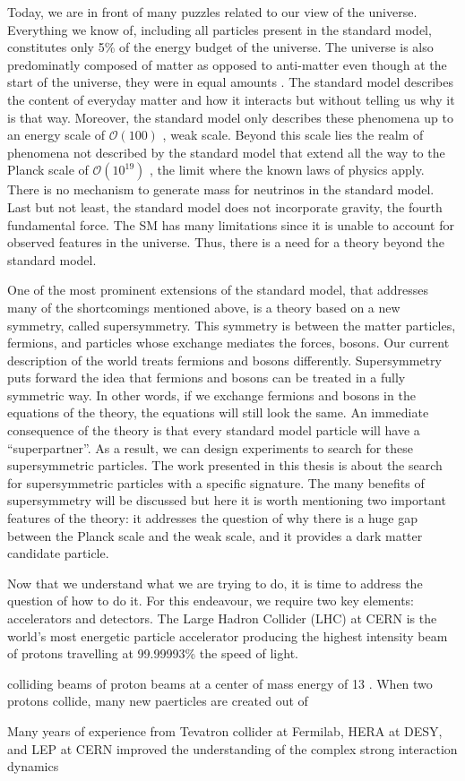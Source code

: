 Today, we are in front of many puzzles related to our view of the universe.
Everything we know of, including all particles present in the standard model, 
constitutes only 5\% of the energy budget of the universe. 
The universe is also predominatly composed of matter as opposed to 
anti-matter even though at the start of the universe, they were in equal 
amounts%
. The standard model describes the content of 
everyday matter 
and how it interacts but without telling us why it is that way.
Moreover, the standard model only describes these phenomena 
up to an energy scale of $\mathcal{O}\left(100\right)$ \GeV, weak scale.
Beyond this scale lies the realm of phenomena not described by the standard 
model that extend all the way to the Planck scale of 
$\mathcal{O}\left(10^{19}\right)$ \GeV, the limit where the known laws of 
physics apply. 
There is no mechanism to generate mass for 
neutrinos in the standard model. Last but not least, the standard model 
does not incorporate gravity, the fourth fundamental force.
The SM has many limitations since it is unable to account for observed 
features in the universe. 
Thus, there is a need for a theory beyond the standard model.

One of the most prominent extensions of the standard model, 
that addresses many of the shortcomings mentioned above, is a theory based on 
a new symmetry, called supersymmetry.
This symmetry is between the matter particles, fermions, and particles whose
exchange mediates the forces, bosons. Our current description of the world
treats fermions and bosons differently. Supersymmetry puts forward the idea
that fermions and bosons can be treated in a fully symmetric way. 
In other words,
if we exchange fermions and bosons in the equations of the theory, the 
equations will still look the same. An immediate consequence of the theory
is that every standard model particle will have a ``superpartner''.
As a result, we can design experiments to search for these 
supersymmetric particles. The work presented in this thesis is about the search for supersymmetric particles with a specific signature.
The many benefits of supersymmetry will be discussed but here it is worth 
mentioning two important features of the theory: it addresses the question 
of why there is a huge gap between the Planck scale and the weak scale, 
and it provides a dark matter candidate particle. 

Now that we understand what we are trying to do, it is time to address 
the question of how to do it.
For this endeavour, we require two key elements: accelerators and detectors.
The Large Hadron Collider (LHC) at CERN is the world's most energetic 
particle accelerator producing the highest intensity beam of protons 
travelling at 99.99993\% the speed of light. 

colliding beams of proton beams at a center of mass 
energy of 13 \TeV. When two protons collide, many new paerticles are 
created out of 


Many years of experience from Tevatron collider at Fermilab\cite{tevatron}, 
HERA at DESY\cite{hera}, and LEP\cite{lep} at CERN improved the understanding of the 
complex strong interaction dynamics 


